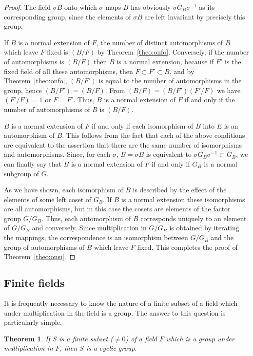 \documentclass[10pt,leqno]{article}
\newtheorem{theo}{Theorem}
\theoremstyle{definition}
\begin{document}
\begin{proof}
The field $\sigma B$ onto which $\sigma$ maps $B$ has obviously $\sigma G_B \sigma^{-1}$ as its corresponding group, since the elements of $\sigma B$ are left invariant by precisely this group.

If $B$ is a normal extension of $F$, the number of distinct automorphisms of $B$ which leave $F$ fixed is $(B/F)$ by Theorem~\ref{theo:onfo}.
Conversely, if the number of automorphisms is $(B/F)$ then $B$ is a normal extension, because if $F'$ is the fixed field of all these automorphisms, then $F \subset F' \subset B$, and by Theorem~\ref{theo:onfo}, $(B/F')$ is equal to the number of automorphisms in the group, hence $(B/F') = (B/F)$.
From $(B/F) = (B/F') (F'/F)$ we have $(F'/F) = 1$ or $F = F'$.
Thus, $B$ is a normal extension of $F$ if and only if the number of automorphisms of $B$ is $(B/F)$.

$B$ is a normal extension of $F$ if and only if each isomorphism of $B$ into $E$ is an automorphism of $B$.
This follows from the fact that each of the above conditions are equivalent to the assertion that there are the same number of isomorphisms and automorphisms.
Since, for each $\sigma$, $B = \sigma B$ is equivalent to $\sigma G_B \sigma^{-1} \subset G_B$, we can finally say that $B$ is a normal extension of $F$ if and only if $G_B$ is a normal subgroup of $G$.

As we have shown, each isomorphism of $B$ is described by the effect of the elements of some left coset of $G_B$.
If $B$ is a normal extension these isomorphisms are all automorphisms, but in this case the cosets are elements of the factor group $G/G_B$.
Thus, each automorphism of $B$ corresponds uniquely to an element of $G/G_B$ and conversely.
Since multiplication in $G/G_B$ is obtained by iterating the mappings, the correspondence is an isomorphism between $G/G_B$ and the group of automorphisms of $B$ which leave $F$ fixed.
This completes the proof of Theorem~\ref{theo:onsi}.
\end{proof}


\subsection{Finite fields}

It is frequently necessary to know the nature of a finite subset of a field which under multiplication in the field is a group.
The answer to this question is particularly simple.


\begin{theo}
\label{theo:onse}
If $S$ is a finite subset ($\not= 0$) of a field $F$ which is a group under multiplication in $F$, then $S$ is a cyclic group.
\end{theo}
\end{document}
